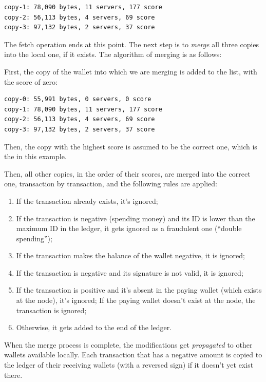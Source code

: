 \documentclass{main}
\begin{document}
\begin{verbatim}
copy-1: 78,090 bytes, 11 servers, 177 score
copy-2: 56,113 bytes, 4 servers, 69 score
copy-3: 97,132 bytes, 2 servers, 37 score
\end{verbatim}

The fetch operation ends at this point. The next step is to \emph{merge}
all three copies into the local one, if it exists. The algorithm of merging
is as follows:

First, the copy of the wallet into which we are merging is added to the list,
with the score of zero:

\begin{verbatim}
copy-0: 55,991 bytes, 0 servers, 0 score
copy-1: 78,090 bytes, 11 servers, 177 score
copy-2: 56,113 bytes, 4 servers, 69 score
copy-3: 97,132 bytes, 2 servers, 37 score
\end{verbatim}

Then, the copy with the highest score is assumed to be the correct one,
which is the  in this example.

Then, all other copies, in the order of their scores, are merged into the
correct one, transaction by transaction, and the following rules are applied:

\begin{enumerate}
\item If the transaction already exists, it's ignored;
\item If the transaction is negative (spending money) and its ID is lower than
the maximum ID in the ledger, it gets ignored as a fraudulent one (``double spending'');
\item If the transaction makes the balance of the wallet negative, it is ignored;
\item If the transaction is negative and its signature is not valid, it is ignored;
\item If the transaction is positive and it's absent in the paying wallet
(which exists at the node), it's ignored; If the paying wallet doesn't exist at the node,
the transaction is ignored;
\item Otherwise, it gets added to the end of the ledger.
\end{enumerate}

When the merge process is complete, the modifications get \emph{propagated} to other wallets
available locally. Each transaction that has a negative amount is
copied to the ledger of their receiving wallets (with a reversed sign)
if it doesn't yet exist there.
\end{document}
